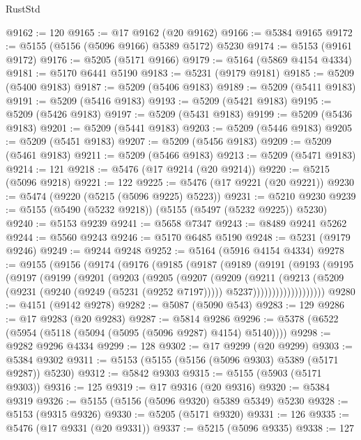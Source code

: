 \begin{lexlean}{RustStd}
\begin{coremodule}
@9162 := 120
@9165 := @17 @9162 (@20 @9162)
@9166 := @5384 @9165
@9172 := @5155 (@5156 (@5096 @9166) @5389 @5172) @5230
@9174 := @5153 (@9161 @9172)
@9176 := @5205 (@5171 @9166)
@9179 := @5164 (@5869 @4154 @4334)
@9181 := @5170 @6441 @5190
@9183 := @5231 (@9179 @9181)
@9185 := @5209 (@5400 @9183)
@9187 := @5209 (@5406 @9183)
@9189 := @5209 (@5411 @9183)
@9191 := @5209 (@5416 @9183)
@9193 := @5209 (@5421 @9183)
@9195 := @5209 (@5426 @9183)
@9197 := @5209 (@5431 @9183)
@9199 := @5209 (@5436 @9183)
@9201 := @5209 (@5441 @9183)
@9203 := @5209 (@5446 @9183)
@9205 := @5209 (@5451 @9183)
@9207 := @5209 (@5456 @9183)
@9209 := @5209 (@5461 @9183)
@9211 := @5209 (@5466 @9183)
@9213 := @5209 (@5471 @9183)
@9214 := 121
@9218 := @5476 (@17 @9214 (@20 @9214))
@9220 := @5215 (@5096 @9218)
@9221 := 122
@9225 := @5476 (@17 @9221 (@20 @9221))
@9230 := @5474 (@9220 (@5215 (@5096 @9225) @5223))
@9231 := @5210 @9230
@9239 := @5155 (@5490 (@5232 @9218)) (@5155 (@5497 (@5232 @9225)) @5230)
@9240 := @5153 @9239
@9241 := @5658 @7347
@9243 := @8489 @9241 @5262
@9244 := @5560 @9243
@9246 := @5170 @6485 @5190
@9248 := @5231 (@9179 @9246)
@9249 := @9244 @9248
@9252 := @5164 (@5916 @4154 @4334)
@9278 := @9155
    (@9156
      (@9174
        (@9176
          (@9185
            (@9187
              (@9189
                (@9191
                  (@9193
                    (@9195
                      (@9197
                        (@9199
                          (@9201
                            (@9203
                              (@9205
                                (@9207
                                  (@9209
                                    (@9211
                                      (@9213
                                        (@5209
                                          (@9231 (@9240 (@9249 (@5231 (@9252 @7197)))))
                                          @5237)))))))))))))))))))
@9280 := @4151 (@9142 @9278)
@9282 := @5087 (@5090 @543)
@9283 := 129
@9286 := @17 @9283 (@20 @9283)
@9287 := @5814 @9286
@9296 := @5378 (@6522 (@5954 (@5118 (@5094 (@5095 (@5096 @9287) @4154) @5140))))
@9298 := @9282 @9296 @4334
@9299 := 128
@9302 := @17 @9299 (@20 @9299)
@9303 := @5384 @9302
@9311 := @5153 (@5155 (@5156 (@5096 @9303) @5389 (@5171 @9287)) @5230)
@9312 := @5842 @9303
@9315 := @5155 (@5903 (@5171 @9303))
@9316 := 125
@9319 := @17 @9316 (@20 @9316)
@9320 := @5384 @9319
@9326 := @5155 (@5156 (@5096 @9320) @5389 @5349) @5230
@9328 := @5153 (@9315 @9326)
@9330 := @5205 (@5171 @9320)
@9331 := 126
@9335 := @5476 (@17 @9331 (@20 @9331))
@9337 := @5215 (@5096 @9335)
@9338 := 127

\end{coremodule}
\end{lexlean}
